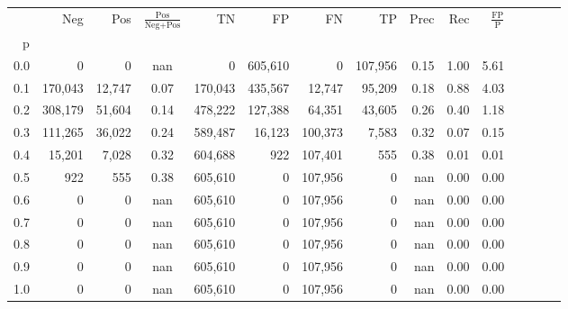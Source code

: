 \begin{tabular}{rrrcrrrrrrrrrrr}
\toprule
{} &      Neg &     Pos & $\frac{\text{Pos}}{\text{Neg}+\text{Pos}}$ &       TN &       FP &       FN &       TP &  Prec &   Rec & $\frac{\text{FP}}{\text{P}}$ \\
p   &          &         &                                            &          &          &          &          &       &       &                              \\
\midrule
0.0 &        0 &       0 &                                        nan &        0 &  605,610 &        0 &  107,956 &  0.15 &  1.00 &                         5.61 \\
0.1 &  170,043 &  12,747 &                                       0.07 &  170,043 &  435,567 &   12,747 &   95,209 &  0.18 &  0.88 &                         4.03 \\
0.2 &  308,179 &  51,604 &                                       0.14 &  478,222 &  127,388 &   64,351 &   43,605 &  0.26 &  0.40 &                         1.18 \\
0.3 &  111,265 &  36,022 &                                       0.24 &  589,487 &   16,123 &  100,373 &    7,583 &  0.32 &  0.07 &                         0.15 \\
0.4 &   15,201 &   7,028 &                                       0.32 &  604,688 &      922 &  107,401 &      555 &  0.38 &  0.01 &                         0.01 \\
0.5 &      922 &     555 &                                       0.38 &  605,610 &        0 &  107,956 &        0 &   nan &  0.00 &                         0.00 \\
0.6 &        0 &       0 &                                        nan &  605,610 &        0 &  107,956 &        0 &   nan &  0.00 &                         0.00 \\
0.7 &        0 &       0 &                                        nan &  605,610 &        0 &  107,956 &        0 &   nan &  0.00 &                         0.00 \\
0.8 &        0 &       0 &                                        nan &  605,610 &        0 &  107,956 &        0 &   nan &  0.00 &                         0.00 \\
0.9 &        0 &       0 &                                        nan &  605,610 &        0 &  107,956 &        0 &   nan &  0.00 &                         0.00 \\
1.0 &        0 &       0 &                                        nan &  605,610 &        0 &  107,956 &        0 &   nan &  0.00 &                         0.00 \\
\bottomrule
\end{tabular}
